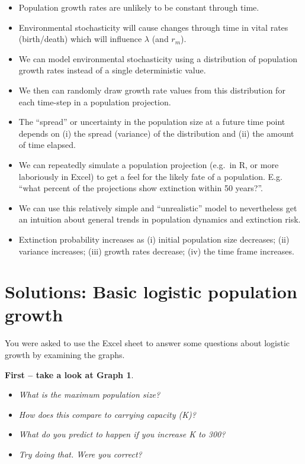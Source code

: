 \documentclass[
  a4paper]{book}
\providecommand{\tightlist}{%
  \setlength{\itemsep}{0pt}\setlength{\parskip}{0pt}}
\begin{document}
\begin{itemize}
\tightlist
\item
  Population growth rates are unlikely to be constant through time.
\item
  Environmental stochasticity will cause changes through time in vital rates (birth/death) which will influence \(\lambda\) (and \(r_m\)).
\item
  We can model environmental stochasticity using a distribution of population growth rates instead of a single deterministic value.
\item
  We then can randomly draw growth rate values from this distribution for each time-step in a population projection.
\item
  The ``spread'' or uncertainty in the population size at a future time point depends on (i) the spread (variance) of the distribution and (ii) the amount of time elapsed.
\item
  We can repeatedly simulate a population projection (e.g.~in R, or more laboriously in Excel) to get a feel for the likely fate of a population. E.g. ``what percent of the projections show extinction within 50 years?''.
\item
  We can use this relatively simple and ``unrealistic'' model to nevertheless get an intuition about general trends in population dynamics and extinction risk.
\item
  Extinction probability increases as (i) initial population size decreases; (ii) variance increases; (iii) growth rates decrease; (iv) the time frame increases.
\end{itemize}

\section{Solutions: Basic logistic population growth}\label{solutions-basic-logistic-population-growth}

You were asked to use the Excel sheet to answer some questions about logistic growth by examining the graphs.

\textbf{First -- take a look at Graph 1}.

\begin{itemize}
\tightlist
\item
  \emph{What is the maximum population size?}
\item
  \emph{How does this compare to carrying capacity (K)?}
\item
  \emph{What do you predict to happen if you increase K to 300?}
\item
  \emph{Try doing that. Were you correct?}
\end{itemize}
\end{document}
